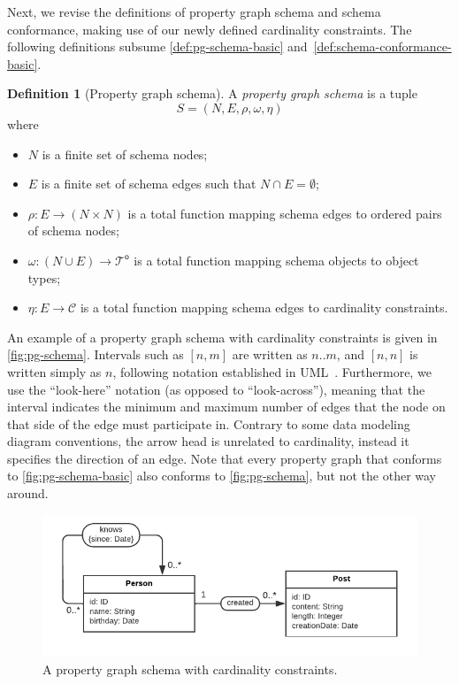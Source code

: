 \documentclass{article}
\theoremstyle{definition}
\newtheorem{definition}{Definition}
\newcommand{\otypes}{\mathcal{T}^\mathsf{o}}
\begin{document}
Next, we revise the definitions of property graph schema and schema conformance, making use of our newly defined cardinality constraints. The following definitions subsume \autoref{def:pg-schema-basic} and~\ref{def:schema-conformance-basic}.

\begin{definition}[Property graph schema]
  \label{def:pg-schema}
  A \emph{property graph schema} is a tuple $$S = (N, E, \rho, \omega, \eta)$$ where
  \begin{itemize}
    \item $N$ is a finite set of schema nodes;
    \item $E$ is a finite set of schema edges such that $N \cap E = \emptyset$;
    \item $\rho : E \to (N \times N)$ is a total function mapping schema edges to ordered pairs of schema nodes;
    \item $\omega : (N \cup E) \to \otypes$ is a total function mapping schema objects to object types;
    \item $\eta : E \to \mathcal{C}$ is a total function mapping schema edges to cardinality constraints.
  \end{itemize}
\end{definition}

An example of a property graph schema with cardinality constraints is given in \autoref{fig:pg-schema}. Intervals such as $[n, m]$ are written as $n..m$, and $[n, n]$ is written simply as $n$, following notation established in UML~\citep{uml}. Furthermore, we use the ``look-here'' notation (as opposed to ``look-across''), meaning that the interval indicates the minimum and maximum number of edges that the node on that side of the edge must participate in. Contrary to some data modeling diagram conventions, the arrow head is unrelated to cardinality, instead it specifies the direction of an edge. Note  that every property graph that conforms to \autoref{fig:pg-schema-basic} also conforms to \autoref{fig:pg-schema}, but not the other way around.

\begin{figure}[t]
  \centering
  \includegraphics{figures/pg-schema.pdf}
  \caption{A property graph schema with cardinality constraints.}
  \label{fig:pg-schema}
\end{figure}
\end{document}
